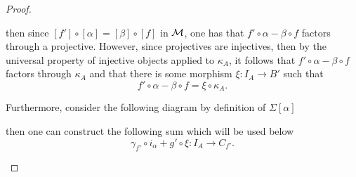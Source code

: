 \begin{proof}
\begin{enumerate}[label={(\bfseries TR\arabic*)}]
{\begin{center}
            \end{center}
            then since \( [f'] \circ [\alpha] = [\beta] \circ [f] \) in \( {\mathcal{M}} \), one has that \( f' \circ \alpha - \beta \circ f \) factors through a projective. However, since projectives are injectives, then by the universal property of injective objects applied to \( \kappa_A \), it follows that \( f' \circ \alpha - \beta \circ f \) factors through \( \kappa_A \) and that there is some morphism \( \xi: I_A \to B' \) such that
            \[
                f' \circ \alpha - \beta \circ f = \xi \circ \kappa_A.
            \]

            Furthermore, consider the following diagram by definition of \( \Sigma [\alpha] \)
            \begin{center}
            \end{center}
            then one can construct the following sum which will be used below
            \[
                \gamma_{f'} \circ i_{\alpha} + g' \circ \xi: I_A \to C_{f'}.
            \]

}
\end{enumerate}
\end{proof}
